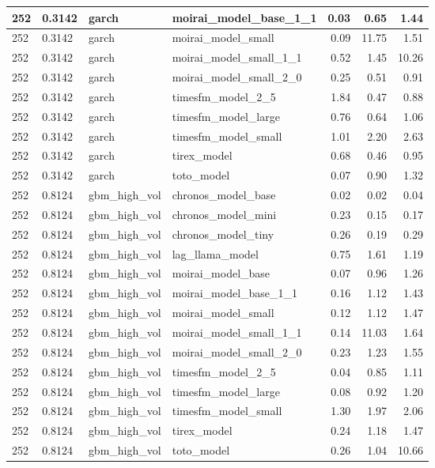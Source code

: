 {\begin{tabular}{llllrrr}
\midrule
252 & 0.3142 & garch & moirai\_model\_base\_1\_1 & 0.03 & 0.65 & 1.44 \\
\midrule
252 & 0.3142 & garch & moirai\_model\_small & 0.09 & 11.75 & 1.51 \\
\midrule
252 & 0.3142 & garch & moirai\_model\_small\_1\_1 & 0.52 & 1.45 & 10.26 \\
\midrule
252 & 0.3142 & garch & moirai\_model\_small\_2\_0 & 0.25 & 0.51 & 0.91 \\
\midrule
252 & 0.3142 & garch & timesfm\_model\_2\_5 & 1.84 & 0.47 & 0.88 \\
\midrule
252 & 0.3142 & garch & timesfm\_model\_large & 0.76 & 0.64 & 1.06 \\
\midrule
252 & 0.3142 & garch & timesfm\_model\_small & 1.01 & 2.20 & 2.63 \\
\midrule
252 & 0.3142 & garch & tirex\_model & 0.68 & 0.46 & 0.95 \\
\midrule
252 & 0.3142 & garch & toto\_model & 0.07 & 0.90 & 1.32 \\
\midrule
252 & 0.8124 & gbm\_high\_vol & chronos\_model\_base & 0.02 & 0.02 & 0.04 \\
\midrule
252 & 0.8124 & gbm\_high\_vol & chronos\_model\_mini & 0.23 & 0.15 & 0.17 \\
\midrule
252 & 0.8124 & gbm\_high\_vol & chronos\_model\_tiny & 0.26 & 0.19 & 0.29 \\
\midrule
252 & 0.8124 & gbm\_high\_vol & lag\_llama\_model & 0.75 & 1.61 & 1.19 \\
\midrule
252 & 0.8124 & gbm\_high\_vol & moirai\_model\_base & 0.07 & 0.96 & 1.26 \\
\midrule
252 & 0.8124 & gbm\_high\_vol & moirai\_model\_base\_1\_1 & 0.16 & 1.12 & 1.43 \\
\midrule
252 & 0.8124 & gbm\_high\_vol & moirai\_model\_small & 0.12 & 1.12 & 1.47 \\
\midrule
252 & 0.8124 & gbm\_high\_vol & moirai\_model\_small\_1\_1 & 0.14 & 11.03 & 1.64 \\
\midrule
252 & 0.8124 & gbm\_high\_vol & moirai\_model\_small\_2\_0 & 0.23 & 1.23 & 1.55 \\
\midrule
252 & 0.8124 & gbm\_high\_vol & timesfm\_model\_2\_5 & 0.04 & 0.85 & 1.11 \\
\midrule
252 & 0.8124 & gbm\_high\_vol & timesfm\_model\_large & 0.08 & 0.92 & 1.20 \\
\midrule
252 & 0.8124 & gbm\_high\_vol & timesfm\_model\_small & 1.30 & 1.97 & 2.06 \\
\midrule
252 & 0.8124 & gbm\_high\_vol & tirex\_model & 0.24 & 1.18 & 1.47 \\
\midrule
252 & 0.8124 & gbm\_high\_vol & toto\_model & 0.26 & 1.04 & 10.66 \\
\bottomrule
\end{tabular}
}